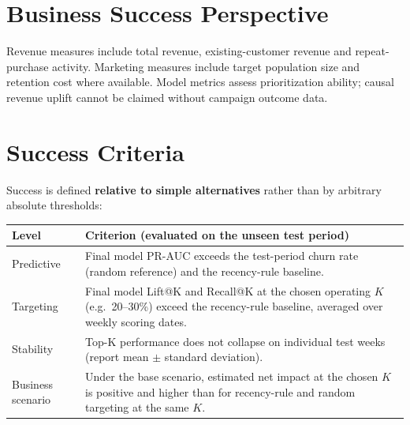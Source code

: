 \section{Business Success Perspective}
\label{sec:2-6}

Revenue measures include total revenue, existing-customer revenue and repeat-purchase activity. Marketing measures include target population size and retention cost where available. Model metrics assess prioritization ability; causal revenue uplift cannot be claimed without campaign outcome data.

\section{Success Criteria}
\label{sec:2-7}

Success is defined \textbf{relative to simple alternatives} rather than by arbitrary absolute thresholds:

\begin{center}
\begin{tabular}{@{}p{3cm}p{11.5cm}@{}}
    \toprule
    Level & Criterion (evaluated on the unseen test period) \\
    \midrule
    Predictive & Final model PR-AUC exceeds the test-period churn rate (random reference) and the recency-rule baseline. \\
    Targeting & Final model Lift@K and Recall@K at the chosen operating $K$ (e.g.\ 20--30\%) exceed the recency-rule baseline, averaged over weekly scoring dates. \\
    Stability & Top-K performance does not collapse on individual test weeks (report mean $\pm$ standard deviation). \\
    Business scenario & Under the base scenario, estimated net impact at the chosen $K$ is positive and higher than for recency-rule and random targeting at the same $K$. \\
    \bottomrule
\end{tabular}
\end{center}
